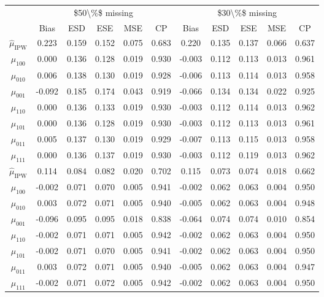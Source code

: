\documentclass[
]{article}
\begin{document}
\begin{table}[!h]
\centering
\begin{tabular}{ccccccccccc}
\toprule
\multicolumn{1}{c}{} & \multicolumn{5}{c}{\$50\textbackslash{}\%\$ missing} & \multicolumn{5}{c}{\$30\textbackslash{}\%\$ missing} \\
\cmidrule(l{3pt}r{3pt}){2-6} \cmidrule(l{3pt}r{3pt}){7-11}
 & Bias & ESD & ESE & MSE & CP & Bias & ESD & ESE & MSE & CP\\
\midrule
$\hat{\mu}_\text{IPW}$ & 0.223 & 0.159 & 0.152 & 0.075 & 0.683 & 0.220 & 0.135 & 0.137 & 0.066 & 0.637\\
$\hat{\mu}_{100}$ & 0.000 & 0.136 & 0.128 & 0.019 & 0.930 & -0.003 & 0.112 & 0.113 & 0.013 & 0.961\\
$\hat{\mu}_{010}$ & 0.006 & 0.138 & 0.130 & 0.019 & 0.928 & -0.006 & 0.113 & 0.114 & 0.013 & 0.958\\
$\hat{\mu}_{001}$ & -0.092 & 0.185 & 0.174 & 0.043 & 0.919 & -0.066 & 0.134 & 0.134 & 0.022 & 0.925\\
$\hat{\mu}_{110}$ & 0.000 & 0.136 & 0.133 & 0.019 & 0.930 & -0.003 & 0.112 & 0.114 & 0.013 & 0.962\\
$\hat{\mu}_{101}$ & 0.000 & 0.136 & 0.128 & 0.019 & 0.930 & -0.003 & 0.112 & 0.113 & 0.013 & 0.961\\
$\hat{\mu}_{011}$ & 0.005 & 0.137 & 0.130 & 0.019 & 0.929 & -0.007 & 0.113 & 0.115 & 0.013 & 0.958\\
$\hat{\mu}_{111}$ & 0.000 & 0.136 & 0.137 & 0.019 & 0.930 & -0.003 & 0.112 & 0.119 & 0.013 & 0.962\\
$\hat{\mu}_\text{IPW}$ & 0.114 & 0.084 & 0.082 & 0.020 & 0.702 & 0.115 & 0.073 & 0.074 & 0.018 & 0.662\\
$\hat{\mu}_{100}$ & -0.002 & 0.071 & 0.070 & 0.005 & 0.941 & -0.002 & 0.062 & 0.063 & 0.004 & 0.950\\
$\hat{\mu}_{010}$ & 0.003 & 0.072 & 0.071 & 0.005 & 0.940 & -0.005 & 0.062 & 0.063 & 0.004 & 0.948\\
$\hat{\mu}_{001}$ & -0.096 & 0.095 & 0.095 & 0.018 & 0.838 & -0.064 & 0.074 & 0.074 & 0.010 & 0.854\\
$\hat{\mu}_{110}$ & -0.002 & 0.071 & 0.071 & 0.005 & 0.942 & -0.002 & 0.062 & 0.063 & 0.004 & 0.950\\
$\hat{\mu}_{101}$ & -0.002 & 0.071 & 0.070 & 0.005 & 0.941 & -0.002 & 0.062 & 0.063 & 0.004 & 0.950\\
$\hat{\mu}_{011}$ & 0.003 & 0.072 & 0.071 & 0.005 & 0.940 & -0.005 & 0.062 & 0.063 & 0.004 & 0.947\\
$\hat{\mu}_{111}$ & -0.002 & 0.071 & 0.072 & 0.005 & 0.942 & -0.002 & 0.062 & 0.063 & 0.004 & 0.950\\
\bottomrule
\end{tabular}
\end{table}
\end{document}
